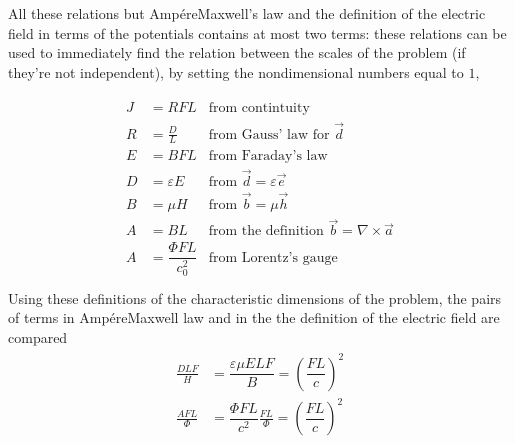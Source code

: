 \documentclass[letterpaper,10pt,english]{jupyterBook}
\begin{document}
\sphinxAtStartPar
All these relations but Ampére\sphinxhyphen{}Maxwell’s law and the definition of the electric field in terms of the potentials contains at most two terms: these relations can be used to immediately find the relation between the scales of the problem (if they’re not independent), by setting the non\sphinxhyphen{}dimensional numbers equal to \(1\),


\begin{equation}\label{equation:ch/regimes-non-dimensional:eq:non-dim:c}
\begin{split}\begin{aligned}
  J & = R F L                                &  \text{from contintuity} \\
  R & = \frac{D}{L}                          &  \text{from Gauss' law for $\vec{d}$} \\
  E & = B F L                                &  \text{from Faraday's law} \\
  D & = \varepsilon E                        &  \text{from $\vec{d} = \varepsilon \vec{e}$} \\
  B & = \mu H                                &  \text{from $\vec{b} = \mu         \vec{h}$} \\
  A & = B L                                  &  \text{from the definition $\vec{b} = \nabla \times \vec{a}$} \\
  A & = \dfrac{\Phi F L}{c_0^2}              &  \text{from Lorentz's gauge} \\
\end{aligned}\end{split}
\end{equation}
\sphinxAtStartPar
Using these definitions of the characteristic dimensions of the problem, the pairs of terms in Ampére\sphinxhyphen{}Maxwell law and in the the definition of the electric field are compared
\begin{equation*}
\begin{split}\begin{aligned}
  \frac{D L F}{H}     & = \dfrac{\varepsilon \mu E L F}{B} = \left( \dfrac{FL}{c} \right)^2 \\
  \frac{A FL}{\Phi} & = \dfrac{\Phi F L}{c^2} \frac{FL}{\Phi} = \left(\dfrac{FL}{c}\right)^2 \\
\end{aligned}\end{split}
\end{equation*}
\sphinxAtStartPar
{} 
\end{document}
